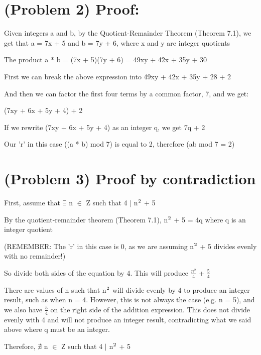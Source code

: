 \documentclass{article}
\begin{document}
\section{(Problem 2) Proof:}

Given integers a and b, by the Quotient-Remainder Theorem (Theorem 7.1), we get that
a = 7x + 5 and b = 7y + 6, where x and y are integer quotients
\par\vspace{0.5cm}\noindent
The product a * b = (7x + 5)(7y + 6) = 49xy + 42x + 35y + 30
\par\vspace{0.5cm}\noindent
First we can break the above expression into 49xy + 42x + 35y + 28 + 2
\par\vspace{0.5cm}\noindent
And then we can factor the first four terms by a common factor, 7, and we get:
\par\vspace{0.5cm}(7xy + 6x + 5y + 4) + 2
\par\vspace{0.5cm}\noindent
If we rewrite (7xy + 6x + 5y + 4) as an integer q, we get 7q + 2\par\noindent
Our 'r' in this case ((a * b) mod 7) is equal to 2, therefore (ab mod 7 = 2)

\section{(Problem 3) Proof by contradiction}

First, assume that $\exists$ n $\in$ Z such that 4 $\mid$ n$\textsuperscript{2}$ + 5
\par\vspace{0.5cm}\noindent
By the quotient-remainder theorem (Theorem 7.1), n$\textsuperscript{2}$ + 5 = 4q where q is an integer quotient
\par\noindent (REMEMBER: The 'r' in this case is 0, as we are assuming n$\textsuperscript{2}$ + 5 divides evenly with no remainder!)
\par\vspace{0.5cm}\noindent
So divide both sides of the equation by 4.  This will produce $\frac{n^{2}}{4}$ + $\frac{5}{4}$
\par\vspace{0.5cm}\noindent
There are values of n such that n$\textsuperscript{2}$ will divide evenly by 4 to produce an integer result, such as when n = 4.  However, this is not always the case (e.g. n = 5), and we also have $\frac{5}{4}$ on the right side of the addition expression.  This does not divide evenly with 4 and will not produce an integer result, contradicting what we said above where q must be an integer.
\par\vspace{0.5cm}\noindent
Therefore, $\nexists$ n $\in$ Z such that 4 $\mid$ n$\textsuperscript{2}$ + 5
\end{document}
